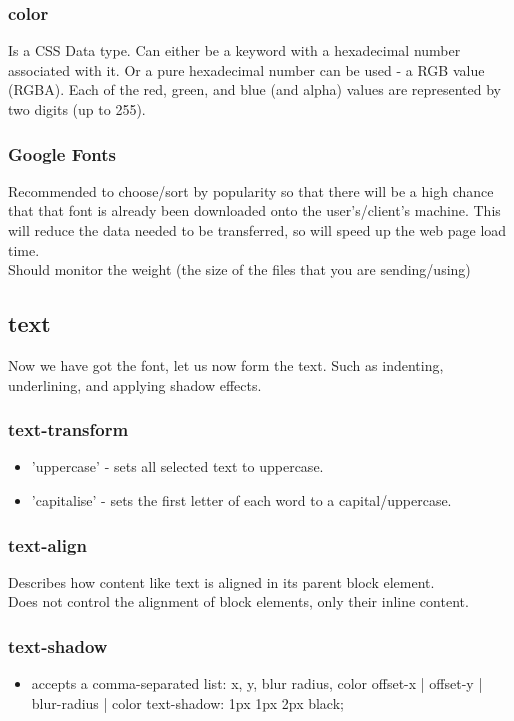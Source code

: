 \documentclass[]{article}
\newcommand{\<}{\guilsinglleft}
\renewcommand{\>}{\guilsinglright}
\begin{document}
\subsubsection{color}
Is a CSS Data type. Can either be a keyword with a hexadecimal number associated with it.  Or a pure hexadecimal number can be used - a RGB value (RGBA).  Each of the red, green, and blue (and alpha) values are represented by two digits (up to 255).

\subsubsection{Google Fonts}
Recommended to choose/sort by popularity so that there will be a high chance that that font is already been downloaded onto the user's/client's machine.  This will reduce the data needed to be transferred, so will speed up the web page load time.
\\
Should monitor the weight (the size of the files that you are sending/using)

\subsection{text} 
Now we have got the font, let us now form the text.  Such as indenting, underlining, and applying shadow effects.

\subsubsection{text-transform}
\begin{itemize}
	\item 'uppercase' - sets all selected text to uppercase.
	\item 'capitalise' - sets the first letter of each word to a capital/uppercase.
\end{itemize}

\subsubsection{text-align}
Describes how  content like text is aligned in its parent block element.
\\
Does not control the alignment of block elements, only their inline content.

\subsubsection{text-shadow}
\begin{itemize}
	\item accepts a comma-separated list: x, y, blur radius, color 
	\subitem offset-x | offset-y | blur-radius | color
	\subitem text-shadow: 1px 1px 2px black;
	
\end{itemize}
\end{document}
